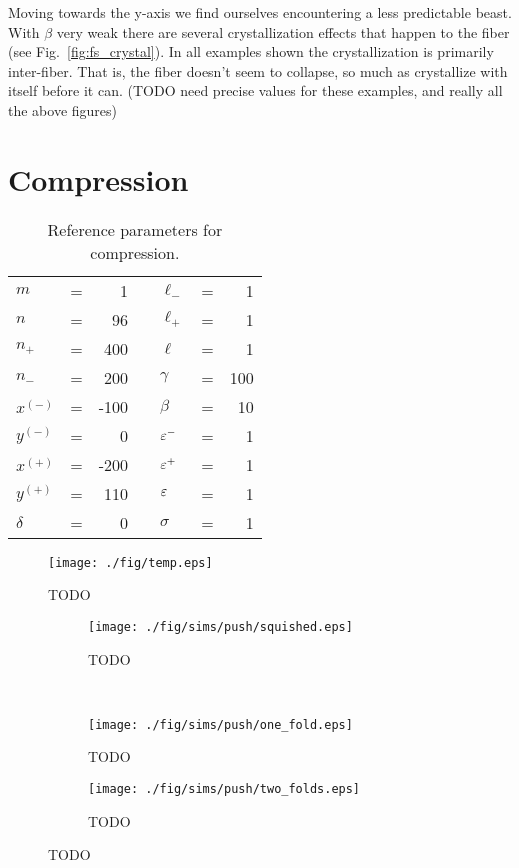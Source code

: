 Moving towards the y-axis we find ourselves encountering a less predictable beast. With $\beta$ very weak there are several crystallization effects that happen to the fiber (see Fig.~\ref{fig:fs_crystal}). In all examples shown the crystallization is primarily inter-fiber. That is, the fiber doesn't seem to collapse, so much as crystallize with itself before it can. (TODO need precise values for these examples, and really all the above figures)

\section{Compression}

	\begin{table}
		\centering
		\caption{Reference parameters for compression. \label{table:compression_reference}}
		\begin{tabular}{lcrclcr}
			$m$ & = & 1 & \hspace{1in} & $\ell_-$ & = & 1 \\
			$n$ & = & 96 & & $\ell_+$ & = & 1 \\
			$n_+$ & = & 400 & & $\ell$ & = & 1 \\
			$n_-$ & = & 200 & & $\gamma$ & = & 100 \\
			$x^{(-)}$ & = & -100 & & $\beta$ & = & 10 \\
			$y^{(-)}$ & = & 0 & & $\varepsilon^-$ & = & 1 \\
			$x^{(+)}$ & = & -200 & & $\varepsilon^+$ & = & 1 \\
			$y^{(+)}$ & = & 110 & & $\varepsilon$ & = & 1 \\
			$\delta$ & = & 0 & & $\sigma$ & = & 1
		\end{tabular}
	\end{table}

	\begin{figure}[t!]
		\begin{center}
			\texttt{[image: ./fig/temp.eps]}
		\end{center}		
		\caption{ TODO
		\label{fig:PushGrid:vanilla}}
	\end{figure}	
	
	\begin{figure*}
		\centering
		\begin{subfigure}{.5\textwidth}
			\centering
			\texttt{[image: ./fig/sims/push/squished.eps]}
			\caption{TODO\label{subfig:push_squished}}
		\end{subfigure}%
		~
		\begin{subfigure}{.5\textwidth}
			\centering
			\texttt{[image: ./fig/sims/push/one\_fold.eps]}
			\caption{TODO \label{subfig:push_one_fold}}
		\end{subfigure}

		\begin{subfigure}{.5\textwidth}
			\centering
			\texttt{[image: ./fig/sims/push/two\_folds.eps]}
			\caption{TODO\label{subfig:push_two_folds}}
		\end{subfigure}
		\caption{TODO\label{fig:push_fold}}
	\end{figure*}

